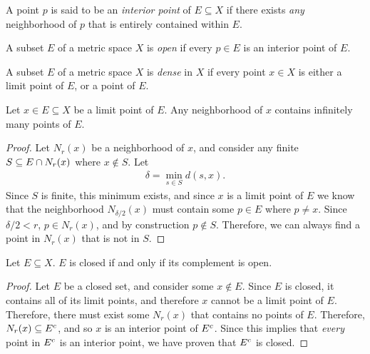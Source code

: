 \begin{defn}
    A point $p$ is said to be an \emph{interior point} of $E \subseteq X$ if there exists \emph{any} neighborhood of $p$ that is entirely contained within $E$.
\end{defn}

\begin{defn}
    A subset $E$ of a metric space $X$ is \emph{open} if every $p \in E$ is an interior point of $E$.
\end{defn}

\begin{defn}
    A subset $E$ of a metric space $X$ is \emph{dense} in $X$ if every point $x \in X$ is either a limit point of $E$, or a point of $E$.
\end{defn}

\begin{thm}\label{thm:neighborhood-limit-points}
    Let $x \in E \subseteq X$ be a limit point of $E$. Any neighborhood of $x$ contains infinitely many points of $E$.
\end{thm}

\begin{proof}
    Let $N_{r}(x)$ be a neighborhood of $x$, and consider any finite $S \subseteq E \cap N_{r}(x)$ where $x \not\in S$. Let
    \begin{align*}
        \delta = \min_{s \in S}d(s, x).
    \end{align*}
    Since $S$ is finite, this minimum exists, and since $x$ is a limit point of $E$ we know that the neighborhood $N_{\delta/2}(x)$ must contain some $p \in E$ where $p \neq x$. Since $\delta/2 < r$, $p \in N_{r}(x)$, and by construction $p \not\in S$. Therefore, we can always find a point in $N_{r}(x)$ that is not in $S$.
\end{proof}

\begin{thm}\label{thm:closed-open-complements}
    Let $E \subseteq X$. $E$ is closed if and only if its complement is open.
\end{thm}

\begin{proof}
    Let $E$ be a closed set, and consider some $x \not\in E$. Since $E$ is closed, it contains all of its limit points, and therefore $x$ cannot be a limit point of $E$. Therefore, there must exist some $N_{r}(x)$ that contains no points of $E$. Therefore, $N_{r}(x) \subseteq E^{c}$, and so $x$ is an interior point of $E^{c}$. Since this implies that \emph{every} point in $E^{c}$ is an interior point, we have proven that $E^{c}$ is closed.
\end{proof}

